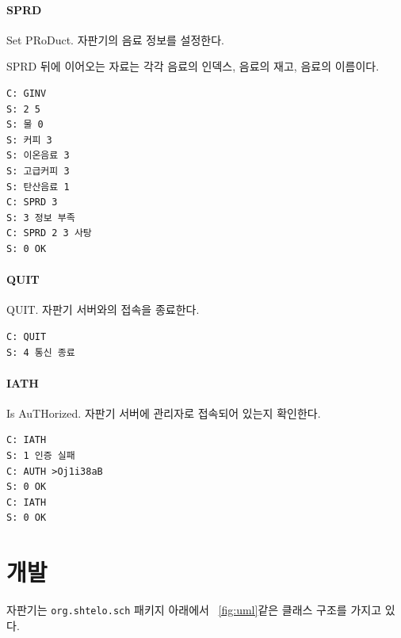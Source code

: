 \documentclass{oblivoir}
\newcommand{\figref}[1]{\figurename~\ref{#1}}
\begin{document}
    \paragraph{SPRD}
    Set PRoDuct. 자판기의 음료 정보를 설정한다.

    SPRD 뒤에 이어오는 자료는 각각 음료의 인덱스,
    음료의 재고, 음료의 이름이다.

    \begin{verbatim}
C: GINV
S: 2 5
S: 물 0
S: 커피 3
S: 이온음료 3
S: 고급커피 3
S: 탄산음료 1
C: SPRD 3
S: 3 정보 부족
C: SPRD 2 3 사탕
S: 0 OK
    \end{verbatim}

    \paragraph{QUIT}
    QUIT. 자판기 서버와의 접속을 종료한다.

    \begin{verbatim}
C: QUIT
S: 4 통신 종료
    \end{verbatim}

    \paragraph{IATH}
    Is AuTHorized. 자판기 서버에 관리자로 접속되어 있는지 확인한다.

    \begin{verbatim}
C: IATH
S: 1 인증 실패
C: AUTH >Oj1i38aB
S: 0 OK
C: IATH
S: 0 OK
    \end{verbatim}

    \section{개발}

    자판기는 \texttt{org.shtelo.sch} 패키지 아래에서 \figref{fig:uml}\과 같은 클래스 구조를 가지고 있다.
\end{document}
